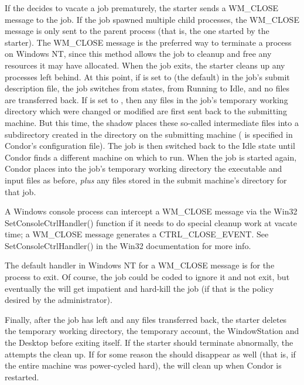 If the  decides to vacate a job prematurely,
the starter sends a WM\_CLOSE message to the job.
If the job spawned multiple child processes, the WM\_CLOSE message is only
sent to the parent process (that is, the one started by the starter).
The
WM\_CLOSE message is the preferred way to terminate a process on Windows NT,
since this method allows the job to cleanup and free any resources it may
have allocated.
When the job exits, the starter cleans up any processes left behind.
At this point, if  is set to
 (the default) in the job's submit description file,
the job switches from states, from Running to Idle,
and no files are transferred back.
If  is set to , then any files
in the job's temporary working directory which were changed or modified are
first sent back to the submitting machine.
But this time, the shadow places these
so-called intermediate files into a subdirectory created in the
 directory on the submitting machine
( is specified in Condor's configuration file).
The job is then switched back to the Idle state until Condor finds
a different machine on which to run.
When the job is started again,
Condor places into the job's temporary working directory the executable
and input files as before,
\emph{plus} any files stored in the submit machine's  directory for that job.  

\Note A Windows console process can intercept a WM\_CLOSE message
via the Win32 SetConsoleCtrlHandler() function if it needs to do special
cleanup work at vacate time; a WM\_CLOSE message
generates a CTRL\_CLOSE\_EVENT.  See SetConsoleCtrlHandler() in the Win32
documentation for more info.

\Note The default handler in Windows NT for a WM\_CLOSE message is for the
process to exit.  Of course, the job could be coded to ignore it and not
exit, but eventually the  will get impatient and hard-kill
the job (if that is the policy desired by the administrator).

Finally, after the job has left and any files transferred back,
the starter
deletes the temporary working directory, the temporary
account, the WindowStation and the Desktop before exiting itself.
If the starter should terminate abnormally, the 
attempts the clean up.
If for some reason the  should disappear as well
(that is, if the entire machine was power-cycled hard),
the  will clean up when Condor is restarted.

